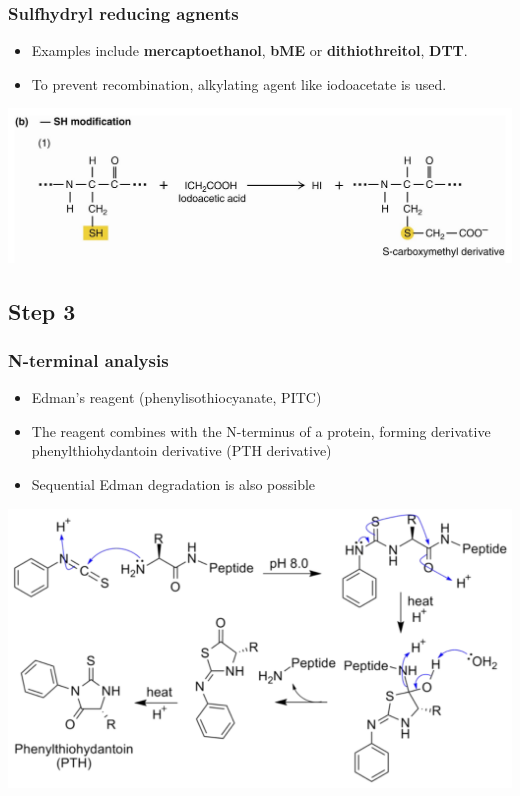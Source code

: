 \documentclass[11pt]{article}
\begin{document}
\subsubsection{Sulfhydryl reducing agnents}
\label{sec:org720c680}
\begin{itemize}
\item Examples include \textbf{mercaptoethanol}, \textbf{bME} or \textbf{dithiothreitol}, \textbf{DTT}.
\item To prevent recombination, alkylating agent like iodoacetate is used.
\end{itemize}
\begin{center}
\includegraphics[width=.9\linewidth]{./images/reducing-sulfhydryl.png}
\end{center}

\newpage
\subsection{Step 3}
\label{sec:orgfc2c351}

\subsubsection{N-terminal analysis}
\label{sec:orgf2d1904}
\begin{itemize}
\item Edman's reagent (phenylisothiocyanate, PITC)
\item The reagent combines with the N-terminus of a protein, forming derivative phenylthiohydantoin derivative (PTH derivative)
\item Sequential Edman degradation is also possible
\end{itemize}
\begin{center}
\includegraphics[width=.9\linewidth]{./images/edman-degradation.png}
\end{center}
\end{document}

